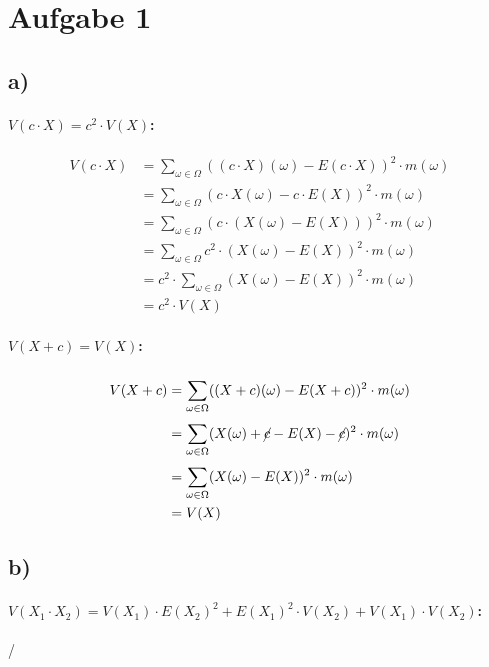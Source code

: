 \section*{Aufgabe 1}
\subsection*{a)}
\paragraph*{$ V(c\cdot X)=c^2\cdot V(X) $:}
\begin{align*}
V(c\cdot X)&=\sum_{\omega\in\Omega}^{}((c\cdot X)(\omega)-E(c\cdot X))^2\cdot m(\omega)\\
&=\sum_{\omega\in\Omega}^{}(c\cdot X(\omega)-c\cdot E(X))^2\cdot m(\omega)\\
&=\sum_{\omega\in\Omega}^{}(c\cdot (X(\omega)-E(X)))^2\cdot m(\omega)\\
&=\sum_{\omega\in\Omega}^{}c^2\cdot (X(\omega)-E(X))^2\cdot m(\omega)\\
&=c^2\cdot\sum_{\omega\in\Omega}^{}(X(\omega)-E(X))^2\cdot m(\omega)\\
&=c^2\cdot V(X)
\end{align*}
\paragraph*{$ V(X+c)=V(X) $:}
\begin{align*}
V(X+c)&=\sum_{\omega\in\Omega}^{}((X+c)(\omega)-E(X+c))^2\cdot m(\omega)\\
&=\sum_{\omega\in\Omega}^{}(X(\omega)+\cancel{c}-E(X)-\cancel{c})^2\cdot m(\omega)\\
&=\sum_{\omega\in\Omega}^{}(X(\omega)-E(X))^2\cdot m(\omega)\\
&=V(X)
\end{align*}
\subsection*{b)}
\paragraph*{$ V(X_1\cdot X_2)=V(X_1)\cdot E(X_2)^2 + E(X_1)^2\cdot V(X_2) + V(X_1)\cdot V(X_2) $:}
/
